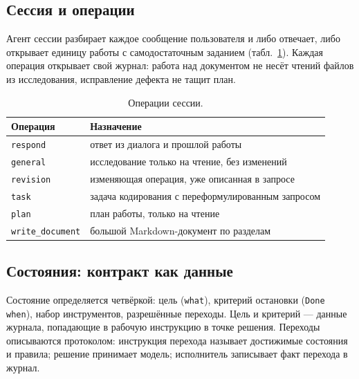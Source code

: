 \documentclass[11pt,a4paper]{article}
\begin{document}
\subsection{Сессия и операции}

Агент сессии разбирает каждое сообщение пользователя и либо отвечает, либо открывает
единицу работы с самодостаточным заданием (табл.~\ref{tab:ops}). Каждая операция открывает
свой журнал: работа над документом не несёт чтений файлов из исследования, исправление
дефекта не тащит план.

\begin{table}[h]
\centering
\small
\caption{Операции сессии.}
\label{tab:ops}
\begin{tabular}{@{}ll@{}}
\toprule
Операция & Назначение \\
\midrule
\texttt{respond} & ответ из диалога и прошлой работы \\
\texttt{general} & исследование только на чтение, без изменений \\
\texttt{revision} & изменяющая операция, уже описанная в запросе \\
\texttt{task} & задача кодирования с переформулированным запросом \\
\texttt{plan} & план работы, только на чтение \\
\texttt{write\_document} & большой Markdown-документ по разделам \\
\bottomrule
\end{tabular}
\end{table}

\subsection{Состояния: контракт как данные}
\label{sec:states}

Состояние определяется четвёркой: цель (\texttt{what}), критерий остановки (\texttt{Done
when}), набор инструментов, разрешённые переходы. Цель и критерий --- данные журнала, попадающие
в рабочую инструкцию в точке решения. Переходы описываются протоколом: инструкция
перехода называет достижимые состояния и правила; решение принимает модель; исполнитель
записывает факт перехода в журнал.
\end{document}
